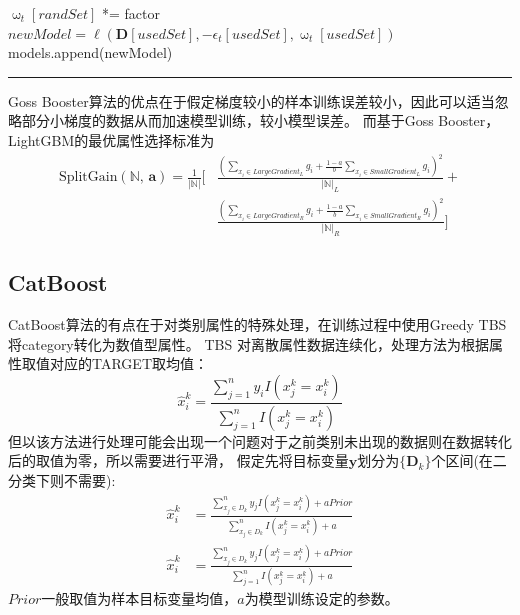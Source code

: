 \documentclass[a4paper]{article}
\begin{document}
\begin{itemize}
						\hspace*{64pt}  $\upomega_t[randSet]$ *= factor\\
						\hspace*{64pt}  $newModel = \ell(\textbf{D}[usedSet], -\epsilon_t[usedSet],\upomega_t[usedSet])$\\
						\hspace*{64pt}  models.append(newModel)\\
				\noindent\rule[0.10\baselineskip]{\textwidth}{0.75pt}
				Goss Booster算法的优点在于假定梯度较小的样本训练误差较小，因此可以适当忽略部分小梯度的数据从而加速模型训练，较小模型误差。
				而基于Goss Booster，LightGBM的最优属性选择标准为
				\begin{align*}
				\text{SplitGain}(\mathbb{N},\,\textbf{a}) = 
						\frac{1}{|\mathbb{N}|}[&\frac{(\sum_{x_i \in LargeGradient_L}g_i + \frac{1-a}{b}\sum_{x_i \in SmallGradient_L}g_i)^2}{|\mathbb{N}|_L}+\\
				 							   &\frac{(\sum_{x_i \in LargeGradient_R}g_i + \frac{1-a}{b}\sum_{x_i \in SmallGradient_R}g_i)^2}{|\mathbb{N}|_R}]
				\end{align*}
		\end{itemize}
	\subsection{CatBoost}
		CatBoost算法的有点在于对类别属性的特殊处理，在训练过程中使用Greedy TBS将category转化为数值型属性。
		TBS 对离散属性数据连续化，处理方法为根据属性取值对应的TARGET取均值：
		$$\hat{x}_i^k = \frac{\sum_{j=1}^n y_iI(x_j^k=x_i^k)}{\sum_{j=1}^n I(x_j^k=x_i^k)}$$
		但以该方法进行处理可能会出现一个问题对于之前类别未出现的数据则在数据转化后的取值为零，所以需要进行平滑，
		假定先将目标变量$\textbf{y}$划分为$\{\textbf{D}_k\}$个区间(在二分类下则不需要):
		\begin{align*}
			\hat{x}_i^k & = \frac{\sum_{x_j \in D_k}^n y_jI(x_j^k=x_i^k)+aPrior}{\sum_{x_j \in D_k}^n I(x_j^k=x_i^k)+a}\\
			\hat{x}_i^k & =  \frac{\sum_{x_j \in D_k}^n y_jI(x_j^k=x_i^k)+aPrior}{\sum_{j=1}^n I(x_j^k=x_i^k)+a} 
		\end{align*}
		$Prior$一般取值为样本目标变量均值，$a$为模型训练设定的参数。

\end{document}
